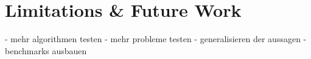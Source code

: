 \chapter{Limitations \& Future Work}
\label{c:limitations}

- mehr algorithmen testen
- mehr probleme testen
- generalisieren der aussagen
- benchmarks ausbauen

 